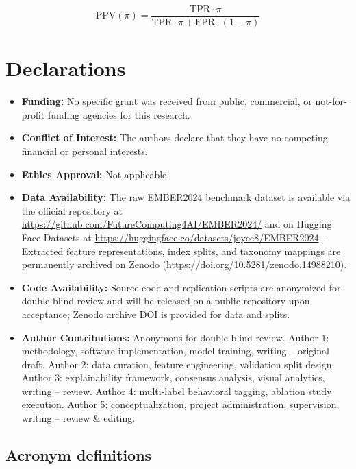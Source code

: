 \documentclass[Number]{sn-jnl}
\begin{document}
\begin{equation}
\text{PPV}(\pi) = \frac{\mathrm{TPR}\cdot\pi}{\mathrm{TPR}\cdot\pi + \mathrm{FPR}\cdot(1-\pi)}
\label{eq:ppv}
\end{equation}

\section*{Declarations}

\begin{itemize}[leftmargin=*]
\item \textbf{Funding:} No specific grant was received from public, commercial, or not-for-profit funding agencies for this research.
\item \textbf{Conflict of Interest:} The authors declare that they have no competing financial or personal interests.
\item \textbf{Ethics Approval:} Not applicable.
\item \textbf{Data Availability:} The raw EMBER2024 benchmark dataset is available via the official repository at \url{https://github.com/FutureComputing4AI/EMBER2024/} and on Hugging Face Datasets at \url{https://huggingface.co/datasets/joyce8/EMBER2024}~\cite{joyce2025ember2024}. Extracted feature representations, index splits, and taxonomy mappings are permanently archived on Zenodo (\url{https://doi.org/10.5281/zenodo.14988210}).
\item \textbf{Code Availability:} Source code and replication scripts are anonymized for double-blind review and will be released on a public repository upon acceptance; Zenodo archive DOI is provided for data and splits.
\item \textbf{Author Contributions:} Anonymous for double-blind review. Author 1: methodology, software implementation, model training, writing -- original draft. Author 2: data curation, feature engineering, validation split design. Author 3: explainability framework, consensus analysis, visual analytics, writing -- review. Author 4: multi-label behavioral tagging, ablation study execution. Author 5: conceptualization, project administration, supervision, writing -- review \& editing.
\end{itemize}




\subsection*{Acronym definitions}
\begin{acronym}
\end{acronym}
\end{document}

